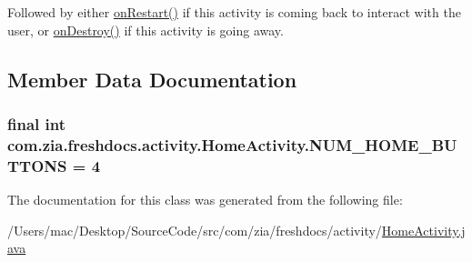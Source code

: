Followed by either \hyperlink{classcom_1_1zia_1_1freshdocs_1_1activity_1_1_home_activity_ab9fcc976215fe4a1107fc0a27964a3d0}{on\-Restart()} if this activity is coming back to interact with the user, or \hyperlink{classcom_1_1zia_1_1freshdocs_1_1activity_1_1_home_activity_a07ce36dece44592580f7a98350edcaec}{on\-Destroy()} if this activity is going away. 

\subsection{Member Data Documentation}
\hypertarget{classcom_1_1zia_1_1freshdocs_1_1activity_1_1_home_activity_a06d4f0c3f8ab0dff29f4408bb3f35a9d}{
\subsubsection[{N\-U\-M\-\_\-\-H\-O\-M\-E\-\_\-\-B\-U\-T\-T\-O\-N\-S}]{\setlength{\rightskip}{0pt plus 5cm}final int com.\-zia.\-freshdocs.\-activity.\-Home\-Activity.\-N\-U\-M\-\_\-\-H\-O\-M\-E\-\_\-\-B\-U\-T\-T\-O\-N\-S = 4\hspace{0.3cm}{\ttfamily [static]}}}\label{classcom_1_1zia_1_1freshdocs_1_1activity_1_1_home_activity_a06d4f0c3f8ab0dff29f4408bb3f35a9d}


The documentation for this class was generated from the following file\-:\begin{DoxyCompactItemize}
\item 
/\-Users/mac/\-Desktop/\-Source\-Code/src/com/zia/freshdocs/activity/\hyperlink{_home_activity_8java}{Home\-Activity.\-java}\end{DoxyCompactItemize}
